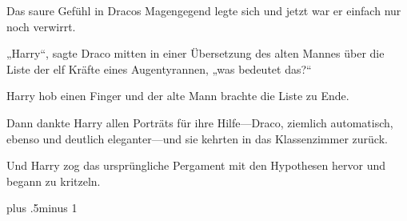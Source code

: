 Das saure Gefühl in Dracos Magengegend legte sich und jetzt war er einfach nur noch verwirrt.

„Harry“, sagte Draco mitten in einer Übersetzung des alten Mannes über die Liste der elf Kräfte eines Augentyrannen, „was bedeutet das?“

Harry hob einen Finger und der alte Mann brachte die Liste zu Ende.

Dann dankte Harry allen Porträts für ihre Hilfe—Draco, ziemlich automatisch, ebenso und deutlich eleganter—und sie kehrten in das Klassenzimmer zurück.

Und Harry zog das ursprüngliche Pergament mit den Hypothesen hervor und begann zu kritzeln.

\baselineskip plus .5\textheight minus 1\baselineskip

\savetrivseps
\setlength{\topsep}{0pt}
\setlength{\partopsep}{0pt}

